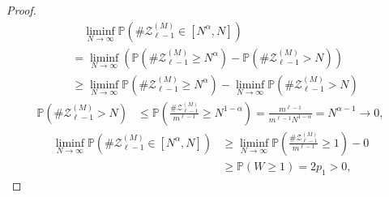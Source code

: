 \begin{proof}
{    }
    \begin{align*}
        &\quad
        \liminf_{N\to\infty}
        \mathbb P\left(
            \#\mathcal Z^{(M)}_{\ell-1}
            \in[N^\alpha,N]
        \right)
        \\
        &
        =
        \liminf_{N\to\infty}
        \left(
            \mathbb P\left(
                \#\mathcal Z^{(M)}_{\ell-1}
                \ge
                N^\alpha
            \right)
            -
            \mathbb P\left(
                \#\mathcal Z^{(M)}_{\ell-1}
                >N
            \right)
        \right)
        \\ &
        \ge
        \liminf_{N\to\infty}
        \mathbb P\left(
            \#\mathcal Z^{(M)}_{\ell-1}
            \ge
            N^\alpha
        \right)
        -
        \liminf_{N\to\infty}
        \mathbb P\left(
            \#\mathcal Z^{(M)}_{\ell-1}
            >N
        \right)
    \end{align*}
    \begin{align*}
        \mathbb P\left(
            \#\mathcal Z^{(M)}_{\ell-1}
            >N
        \right)
        &
        \le
        \mathbb P\left(
            \frac{\#\mathcal Z^{(M)}_{\ell-1}}{m^{\ell-1}}
            \ge
            N^{1-\alpha}
        \right)
        =
        \frac{m^{\ell-1}}{m^{\ell-1}N^{1-\alpha}}
        =
        N^{\alpha-1}
        \to
        0,
    \end{align*}
    \begin{align*}
        \liminf_{N\to\infty}
        \mathbb P\left(
            \#\mathcal Z^{(M)}_{\ell-1}
            \in[N^\alpha,N]
        \right)
        &
        \ge
        \liminf_{N\to\infty}
        \mathbb P\left(
            \frac{\#\mathcal Z^{(M)}_{\ell-1}}{m^{\ell-1}}
            \ge
            1
        \right)
        -
        0
        \\ &
        \ge
        \mathbb P(W\ge 1)
        =
        2p_1
        >
        0,
    \end{align*}
\end{proof}
